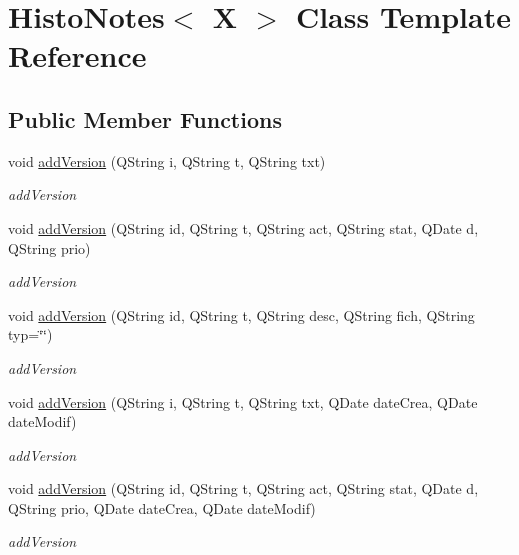 \hypertarget{class_histo_notes}{}\section{Histo\+Notes$<$ X $>$ Class Template Reference}
\label{class_histo_notes}
\subsection*{Public Member Functions}
\begin{DoxyCompactItemize}
\item 
void \hyperlink{class_histo_notes_a3c173ff3cbc3c69db0f5ebd0449e7f63}{add\+Version} (Q\+String i, Q\+String t, Q\+String txt)
\begin{DoxyCompactList}\small\item\em add\+Version \end{DoxyCompactList}\item 
void \hyperlink{class_histo_notes_a9d8481abfbde9f9867e9e467466b17b3}{add\+Version} (Q\+String id, Q\+String t, Q\+String act, Q\+String stat, Q\+Date d, Q\+String prio)
\begin{DoxyCompactList}\small\item\em add\+Version \end{DoxyCompactList}\item 
void \hyperlink{class_histo_notes_aba6b2f6108e87c23e337a504afe8094a}{add\+Version} (Q\+String id, Q\+String t, Q\+String desc, Q\+String fich, Q\+String typ=\char`\"{}\char`\"{})
\begin{DoxyCompactList}\small\item\em add\+Version \end{DoxyCompactList}\item 
void \hyperlink{class_histo_notes_a7b9f951581411f2ab73f36683c2b70fb}{add\+Version} (Q\+String i, Q\+String t, Q\+String txt, Q\+Date date\+Crea, Q\+Date date\+Modif)
\begin{DoxyCompactList}\small\item\em add\+Version \end{DoxyCompactList}\item 
void \hyperlink{class_histo_notes_adab2b45069a477b34c1506acea9bc316}{add\+Version} (Q\+String id, Q\+String t, Q\+String act, Q\+String stat, Q\+Date d, Q\+String prio, Q\+Date date\+Crea, Q\+Date date\+Modif)
\begin{DoxyCompactList}\small\item\em add\+Version \end{DoxyCompactList}\item 

\end{DoxyCompactItemize}
